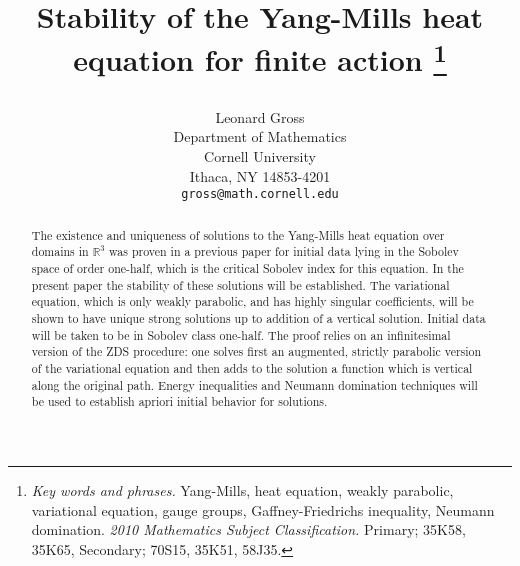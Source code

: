 \documentclass[12pt]{article}
\def \R{\mathbb R}
\numberwithin{equation}{section}
\begin{document}
\title{Stability of the Yang-Mills heat equation for finite action
\footnote{\emph{Key words and phrases.} Yang-Mills, heat equation, weakly parabolic, 
    variational equation, 
    gauge groups,  Gaffney-Friedrichs inequality, Neumann domination.  \newline
 \indent 
\emph{2010 Mathematics Subject Classification.} 
 Primary; 35K58, 35K65,  Secondary; 70S15, 35K51, 58J35.} 
\author{Leonard Gross \\
Department of Mathematics\\
Cornell University\\
Ithaca, NY 14853-4201\\
{\tt gross@math.cornell.edu}}
}



\maketitle


\begin{abstract}
The existence and uniqueness of solutions to the Yang-Mills heat equation over domains
in $\R^3$  was  proven in a previous paper for  initial data  lying in the Sobolev space of
order one-half, which is the critical Sobolev index for this equation.
In the present paper the stability of these solutions will be established.
The variational equation, which is only weakly parabolic, and has highly singular coefficients,
will be shown to have unique strong solutions up to addition of a vertical solution.
Initial data will be taken to be in Sobolev class one-half.
The proof relies on an infinitesimal version of the ZDS procedure: one solves first
an augmented, strictly parabolic version of the variational equation and then adds
to the solution a function which is vertical along the original path.
Energy inequalities and Neumann domination techniques will be used to establish
apriori initial behavior for solutions.

\end{abstract}



\end{document}
